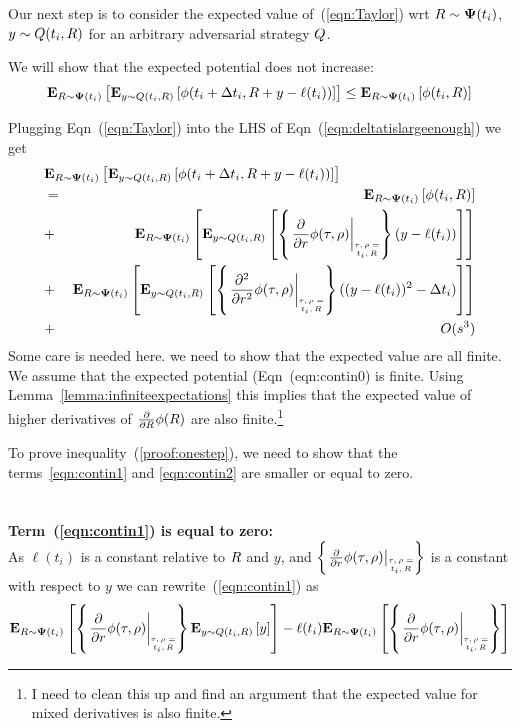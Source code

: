 \documentclass{article}[12pt]
\begin{document}
Our next step is to consider the expected value of~(\ref{eqn:Taylor}) wrt $R \sim {\bf \Psi}(t_i)$,
$y \sim Q(t_i,R)$ for an arbitrary adversarial strategy
$Q$.

We will show that the expected potential does not increase:
\begin{equation} \label{eqn:deltatislargeenough}
     {\bf E}_{R \sim {\bf \Psi}(t_i)}\left[  {\bf E}_{y \sim Q(t_i,R)}\left[ \phi(t_i+\Delta t_i,R+y-\ell(t_i)) \right] \right] \leq {\bf E}_{R \sim {\bf \Psi}(t_i)}\left[ \phi(t_i,R) \right]
\end{equation}

Plugging Eqn~(\ref{eqn:Taylor}) into the LHS of
Eqn~(\ref{eqn:deltatislargeenough}) we get
\begin{eqnarray}
  \lefteqn{\E{\R \sim \state(t_i)}{\E{y \sim \adversM(t_i,\R)}{\pot(t_i+\deltat_i,\R+y-\ell(t_i))}}} \\
  &=& \E{\R \sim \state(t_i)}{\pot(t_i,\R)} \label{eqn:contin0}\\
  &+& \E{\R \sim \state(t_i)}{\E{y \sim \adversM(t_i,\R)}{\at{\frac{\partial}{\partial r}} (y-\ell(t_i))}} \label{eqn:contin1}\\
  &+& \E{\R \sim \state(t_i)}{\E{y \sim
      \adversM(t_i,\R)}{\at{\frac{\partial^2}{\partial r^2}}
      ((y-\ell(t_i))^2 - \deltat_i)}}
  \label{eqn:contin2}\\
  &+& O(s^3) \label{eqn:contin3}
\end{eqnarray}
Some care is needed here. we need to show that the expected value
are all finite. We assume that the expected potential
(Eqn~({eqn:contin0}) is finite. Using
Lemma~\ref{lemma:infiniteexpectations} this implies that the expected
value of higher derivatives of $\frac{\partial}{\partial R} \phi(R)$
are also finite.\footnote{I need to clean this up and find an argument
  that the expected value for mixed derivatives is also finite.}


To prove inequality~(\ref{proof:onestep}), we need to show that the
terms~\ref{eqn:contin1} and \ref{eqn:contin2} are smaller or equal to
zero.
~\\~\\~\\
{\bf Term~(\ref{eqn:contin1}) is equal to zero:}\\
As $\ell(t_i)$ is a constant
relative to $R$ and $y$, and $\at{\frac{\partial}{\partial r}}$ is a
constant with respect to $y$ we can rewrite~(\ref{eqn:contin1}) as
\begin{equation} \label{eqnterm1.1}
  \E{\R \sim \state(t_i)}{\at{\frac{\partial}{\partial r}}
    \E{y \sim \adversM(t_i,\R)}{y} }
- \ell(t_i) \E{\R \sim \state(t_i)}{\at{\frac{\partial}{\partial r}}}
\end{equation}
\end{document}
